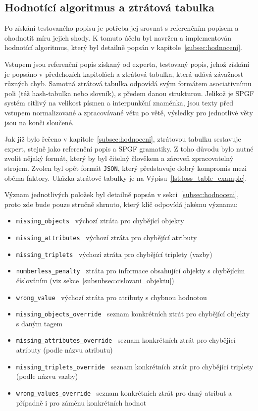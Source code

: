 \subsection{Hodnotící algoritmus a ztrátová tabulka}
Po získání testovaného popisu je potřeba jej srovnat s referenčním popisem a ohodnotit míru jejich shody.
K tomuto účelu byl navržen a implementován hodnotící algoritmus, který byl detailně popsán v kapitole~\ref{subsec:hodnoceni}.

Vstupem jsou referenční popis získaný od experta, testovaný popis, jehož získání je popsáno v předchozích kapitolách a ztrátová tabulka,
která udává závažnost různých chyb.
Samotná ztrátová tabulka odpovídá svým formátem asociativnímu poli (též hash-tabulka nebo slovník), s předem danou strukturou.
Jelikož je SPGF systém citlivý na velikost písmen a interpunkční znaménka, jsou texty před vstupem normalizované
a zpracovávané větu po větě, výsledky pro jednotlivé věty jsou na konči sloučené.

Jak již bylo řečeno v kapitole~\ref{subsec:hodnoceni}, ztrátovou tabulku sestavuje expert, stejně jako referenční popis a SPGF gramatiky.
Z toho důvodu bylo nutné zvolit nějaký formát, který by byl čitelný člověkem a zároveň zpracovatelný strojem.
Zvolen byl opět formát \texttt{JSON}, který představuje dobrý kompromis mezi oběma faktory.
Ukázka ztrátové tabulky je na Výpisu~\ref{lst:loss_table_example}.



Význam jednotlivých položek byl detailně popsán v sekci~\ref{subsec:hodnoceni}, proto zde bude pouze stručně shrnuto,
který klíč odpovídá jakému významu:
\begin{itemize}
	\item \texttt{missing\_objects} \to\ výchozí ztráta pro chybějící objekty
	\item \texttt{missing\_attributes} \to\ výchozí ztráta pro chybějící atributy
	\item \texttt{missing\_triplets} \to\ výchozí ztráta pro chybějící triplety (vazby)
	\item \texttt{numberless\_penalty} \to\ ztráta pro informace obsahující objekty s chybějícím číslováním (viz sekce~\ref{subsubsec:cislovani_objektu})
	\item \texttt{wrong\_value} \to\ výchozí ztráta pro atributy s chybnou hodnotou
	\item \texttt{missing\_objects\_override} \to\ seznam konkrétních ztrát pro chybějící objekty s daným tagem
	\item \texttt{missing\_attributes\_override} \to\ seznam konkrétních ztrát pro chybějící atributy (podle názvu atributu)
	\item \texttt{missing\_triplets\_override} \to\ seznam konkrétních ztrát pro chybějící triplety (podle názvu vazby)
	\item \texttt{wrong\_values\_override} \to\ seznam konkrétních ztrát pro daný atribut a případně i pro záměnu konkrétních hodnot
\end{itemize}

